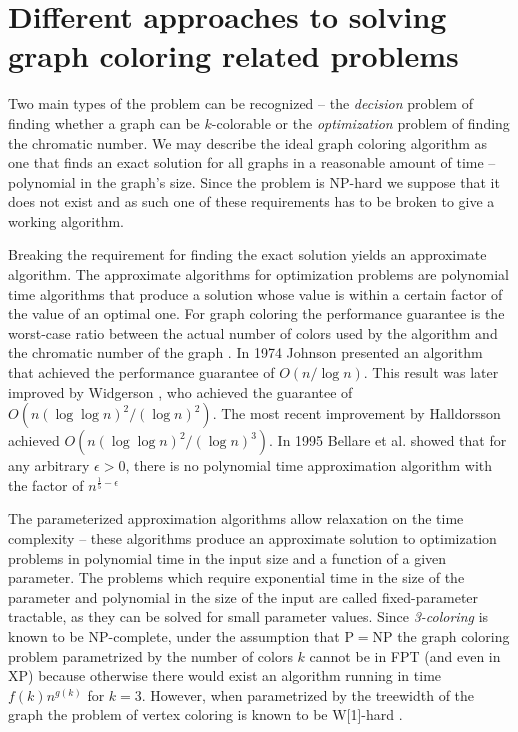 
\section{Different approaches to solving graph coloring related problems}
Two main types of the problem can be recognized -- the \textit{decision} problem of finding whether a graph can be $k$-colorable or the \textit{optimization} problem of finding the chromatic number.
We may describe the ideal graph coloring algorithm as one that finds an exact solution for all graphs in a reasonable amount of time -- polynomial in the graph's size. Since the problem is NP-hard we suppose that it does not exist and as such one of these requirements has to be broken to give a working algorithm.

Breaking the requirement for finding the exact solution yields an approximate algorithm. The approximate algorithms for optimization problems are polynomial time algorithms that produce a solution whose value is within a certain factor of the value of an optimal one. For graph coloring the performance guarantee is the worst-case ratio between the actual number of colors used by the algorithm and the chromatic number of the graph \cite{williamson2011design}.
In 1974
Johnson \cite{johnson1973approximation}
presented an algorithm that achieved the performance guarantee of $O(n/\log n)$. This result was later improved by
Widgerson \cite{wigderson1983improving}
, who achieved the guarantee of $O(n(\log \log n)^2/(\log n)^2)$. The most recent improvement by
Halldorsson \cite{halldorsson2015progress}
achieved $O(n(\log \log n)^2/(\log n)^3)$. In 1995
Bellare et al. \cite{bellare1998free}
showed that for any arbitrary $\epsilon > 0$, there is no polynomial time approximation algorithm with the factor of $n^{\frac{1}{5} - \epsilon}$

The parameterized approximation algorithms allow relaxation on the time complexity -- these algorithms produce an approximate solution to optimization problems in polynomial time in the input size and a function of a given parameter. The problems which require exponential time in the size of the parameter and polynomial in the size of the input are called fixed-parameter tractable, as they can be solved for small parameter values. Since \textit{3-coloring} is known to be NP-complete, under the assumption that $\mathrm{P}=\mathrm{NP}$ the graph coloring problem parametrized by the number of colors $k$ cannot be in FPT (and even in XP) because otherwise there would exist an algorithm running in time $f(k) n^{g(k)}$ for $k=3$.
However, when parametrized by the treewidth of the graph the problem of vertex coloring is known to be W[1]-hard \cite{cygan2015parameterized}.

